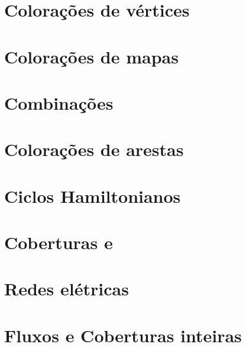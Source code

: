 \section{Colorações de vértices}
\section{Colorações de mapas}
\section{Combinações}
\section{Colorações de arestas}
\section{Ciclos Hamiltonianos}
\section{Coberturas e }
\section{Redes elétricas}
\section{Fluxos e Coberturas inteiras}
